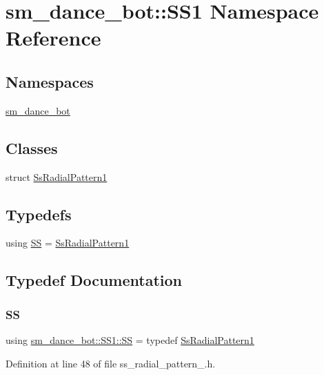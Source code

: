 \hypertarget{namespacesm__dance__bot_1_1SS1}{}\section{sm\+\_\+dance\+\_\+bot\+:\+:S\+S1 Namespace Reference}
\label{namespacesm__dance__bot_1_1SS1}
\subsection*{Namespaces}
\begin{DoxyCompactItemize}
\item 
 \hyperlink{namespacesm__dance__bot_1_1SS1_1_1sm__dance__bot}{sm\+\_\+dance\+\_\+bot}
\end{DoxyCompactItemize}
\subsection*{Classes}
\begin{DoxyCompactItemize}
\item 
struct \hyperlink{structsm__dance__bot_1_1SS1_1_1SsRadialPattern1}{Ss\+Radial\+Pattern1}
\end{DoxyCompactItemize}
\subsection*{Typedefs}
\begin{DoxyCompactItemize}
\item 
using \hyperlink{namespacesm__dance__bot_1_1SS1_a84fc38da71be89ddc4805298f7b82c66}{SS} = \hyperlink{structsm__dance__bot_1_1SS1_1_1SsRadialPattern1}{Ss\+Radial\+Pattern1}
\end{DoxyCompactItemize}


\subsection{Typedef Documentation}
\mbox{\label{namespacesm__dance__bot_1_1SS1_a84fc38da71be89ddc4805298f7b82c66}} 
\subsubsection{\texorpdfstring{SS}{SS}}
{\footnotesize\ttfamily using \hyperlink{namespacesm__dance__bot_1_1SS1_a84fc38da71be89ddc4805298f7b82c66}{sm\+\_\+dance\+\_\+bot\+::\+S\+S1\+::\+SS} = typedef \hyperlink{structsm__dance__bot_1_1SS1_1_1SsRadialPattern1}{Ss\+Radial\+Pattern1}}



Definition at line 48 of file ss\+\_\+radial\+\_\+pattern\+\_.\+h.

